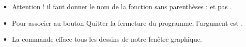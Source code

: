 \documentclass[11pt,class=report,crop=false]{standalone}
\begin{document}
\begin{cours}
\begin{itemize}
  \item Attention ! il faut donner le nom de la fonction sans parenthèses :  et pas .
  
  \item Pour associer au bouton \og{}Quitter\fg{} la fermeture du programme, l'argument est .
  
  \item La commande  efface tous les dessins de notre fenêtre graphique.
  
\end{itemize}
\end{cours}


\end{document}
